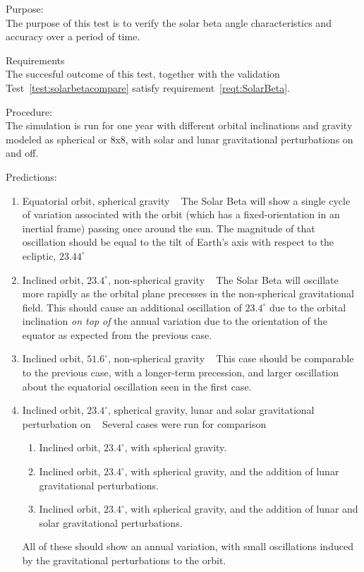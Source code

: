 \label{test:solarbetalongterm}
\begin{description}
\item{Purpose:} \\
The purpose of this test is to verify the solar beta angle characteristics
and accuracy over a period of time. 

\item{Requirements} \\
The succesful outcome of this test, together with the validation Test~\ref{test:solarbetacompare} satisfy requirement~\ref{reqt:SolarBeta}.
\item{Procedure:} \\
The simulation is run for one
year with different orbital inclinations and gravity modeled as
spherical or 8x8, with solar and lunar gravitational perturbations on and off.

\item{Predictions:}
\begin{enumerate}
 \item {Equatorial orbit, spherical gravity} \ \newline
The Solar Beta will show a single cycle of variation associated with the orbit (which has a fixed-orientation in an inertial frame) passing once around the sun.  The magnitude of that oscillation should be equal to the tilt of Earth's axis with respect to the ecliptic, $23.44^\circ$
\item{Inclined orbit, $23.4^\circ$, non-spherical gravity} \ \newline
The Solar Beta will oscillate more rapidly as the orbital plane precesses in the non-spherical gravitational field.  This should cause an additional oscillation of $23.4^\circ$ due to the orbital inclination \textit{on top of} the annual variation due to the orientation of the equator as expected from the previous case.  
\item{Inclined orbit, $51.6^\circ$, non-spherical gravity} \ \newline
This case should be comparable to the previous case, with a longer-term precession, and larger oscillation about the equatorial oscillation seen in the first case. 
\item{Inclined orbit, $23.4^\circ$, spherical gravity, lunar and solar gravitational perturbation on} \ \newline
Several cases were run for comparison
\begin{enumerate}
 \item Inclined orbit, $23.4^\circ$,  with spherical gravity.
 \item Inclined orbit, $23.4^\circ$,  with spherical gravity, and the addition of lunar gravitational perturbations.
 \item Inclined orbit, $23.4^\circ$,  with spherical gravity, and the addition of lunar and solar gravitational perturbations.
\end{enumerate}
All of these should show an annual variation, with small oscillations induced by the gravitational perturbations to the orbit. 


\end{enumerate}
\end{description}
